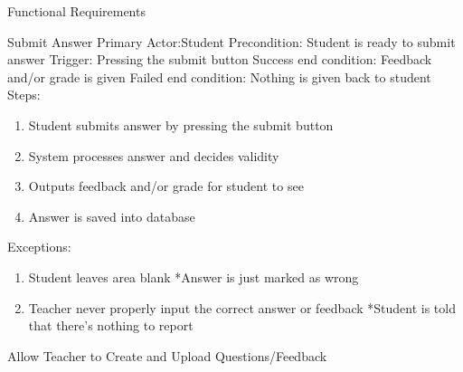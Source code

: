 \documentclass{article}
\begin{document}
\begin{section}{Functional Requirements}
    \begin{subsection}{Submit Answer}
    Primary Actor:Student \newline
    Precondition: Student is ready to submit answer \newline
    Trigger: Pressing the submit button \newline
    Success end condition: Feedback and/or grade is given       \newline
    Failed end condition: Nothing is given back to student      \newline
    \newline
    Steps:
    \begin{enumerate}
    \item{Student submits answer by pressing the submit             button}
    \item{System processes answer and decides validity}
    \item{Outputs feedback and/or grade for student to see}
    \item{Answer is saved into database}
    \end{enumerate}
    Exceptions:
    \begin{enumerate}
    \item{Student leaves area blank \newline
	*Answer is just marked as wrong}
	\addtocounter{enumi}{1}
    \item{Teacher never properly input the correct answer or     feedback \newline
	*Student is told that there's nothing to report}
    \end{enumerate}
    \end{subsection}
    
    \begin{subsection}{Allow Teacher to Create and Upload       Questions/Feedback}
    

\end{subsection}
\end{section}
\end{document}
